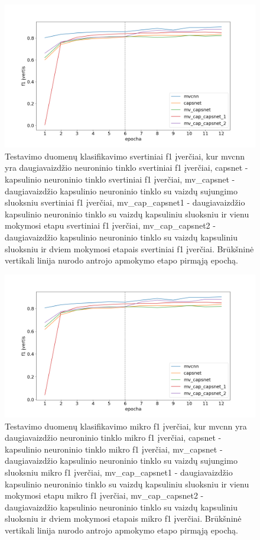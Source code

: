 \begin{figure}[H]
	\centering
	\includegraphics[scale=0.4]{img/weighted.png}
	\caption{
		Testavimo duomenų klasifikavimo svertiniai f1 įverčiai, kur mvcnn yra daugiavaizdžio neuroninio tinklo svertiniai f1 įverčiai, capsnet - kapsulinio neuroninio tinklo svertiniai f1 įverčiai, mv\_capsnet - daugiavaizdžio kapsulinio neuroninio tinklo su vaizdų sujungimo sluoksniu svertiniai f1 įverčiai, mv\_cap\_capsnet1 - daugiavaizdžio kapsulinio neuroninio tinklo su vaizdų kapsuliniu sluoksniu ir vienu mokymosi etapu svertiniai f1 įverčiai, mv\_cap\_capsnet2 - daugiavaizdžio kapsulinio neuroninio tinklo su vaizdų kapsuliniu sluoksniu ir dviem mokymosi etapais svertiniai f1 įverčiai. Brūkšninė vertikali linija nurodo antrojo apmokymo etapo pirmąją epochą.
	}
	\label{img:weighted_f1}
\end{figure}

\begin{figure}[H]
	\centering
	\includegraphics[scale=0.4]{img/micro.png}
	\caption{
		Testavimo duomenų klasifikavimo mikro f1 įverčiai, kur mvcnn yra daugiavaizdžio neuroninio tinklo mikro f1 įverčiai, capsnet - kapsulinio neuroninio tinklo mikro f1 įverčiai, mv\_capsnet - daugiavaizdžio kapsulinio neuroninio tinklo su vaizdų sujungimo sluoksniu mikro f1 įverčiai, mv\_cap\_capsnet1 - daugiavaizdžio kapsulinio neuroninio tinklo su vaizdų kapsuliniu sluoksniu ir vienu mokymosi etapu mikro f1 įverčiai, mv\_cap\_capsnet2 - daugiavaizdžio kapsulinio neuroninio tinklo su vaizdų kapsuliniu sluoksniu ir dviem mokymosi etapais mikro f1 įverčiai. Brūkšninė vertikali linija nurodo antrojo apmokymo etapo pirmąją epochą.
	}
	\label{img:micro_f1}
\end{figure}

